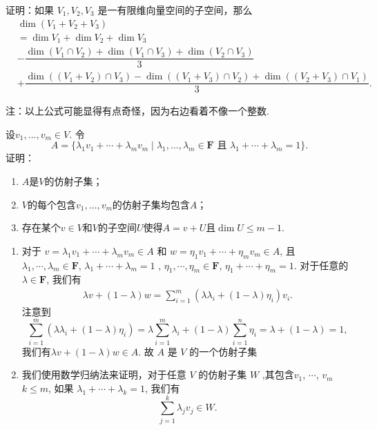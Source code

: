 \begin{exercise}
\begin{exgroup}
\begin{answer}
        \end{answer}

        \item 证明：如果 $V_1,V_2,V_3$ 是一有限维向量空间的子空间，那么
        \begin{align*}
            &\dim(V_1+V_2+V_3) \\
            &= \dim V_1+\dim V_2+\dim V_3 \\
            &-\dfrac{\dim(V_1\cap V_2)+\dim(V_1\cap V_3)+\dim(V_2\cap V_3)}{3} \\
            &+\dfrac{\dim((V_1 + V_2) \cap V_3) - \dim((V_1 + V_3) \cap V_2) + \dim((V_2 + V_3) \cap V_1)}{3}.
        \end{align*}

        注：以上公式可能显得有点奇怪，因为右边看着不像一个整数.
        \begin{answer}

        \end{answer}

        \item 设$v_1,\ldots,v_m\in V$. 令
        \[A=\{\lambda_1v_1+\cdots+\lambda_mv_m \mid \lambda_1,\ldots,\lambda_m\in\mathbf{F}\text{~且~}\lambda_1+\cdots+\lambda_m=1\}.\]
        证明：
        \begin{enumerate}
            \item $A$是$V$的仿射子集；

            \item $V$的每个包含$v_1,\ldots,v_m$的仿射子集均包含$A$；

            \item 存在某个$v\in V$和$V$的子空间$U$使得$A=v+U$且$\dim U\leqslant m-1$.
        \end{enumerate}
    \begin{answer}
        \begin{enumerate}
            \item 对于 $v=\lambda_1 v_1+\cdots+\lambda_m v_m\in A$ 和 $w=\eta_1 v_1+\cdots+\eta_m v_m\in A$, 且 $\lambda_1,\cdots,\lambda_m\in  \mathbf{F}$, $\lambda_1+\cdots+\lambda_m=1$ , $\eta_1,\cdots,\eta_m\in \mathbf{F}$, $\eta_1+\cdots+\eta_m=1$. 对于任意的$\lambda\in \mathbf{F}$, 我们有
            \begin{align*}
                \lambda v+(1-\lambda) w=\sum_{i=1}^m(\lambda\lambda_i+(1-\lambda)\eta_i)v_i.
            \end{align*}
            注意到
            \[ \sum_{i=1}^m(\lambda\lambda_i+(1-\lambda)\eta_i)=\lambda\sum_{i=1}^m\lambda_i+(1-\lambda)\sum_{i=1}^n\eta_i=\lambda+(1-\lambda)=1, \]
            我们有$\lambda v+(1-\lambda) w\in A$. 故 $A$ 是 $V$ 的一个仿射子集
        \item 我们使用数学归纳法来证明，对于任意 $V$ 的仿射子集 $W$ ,其包含$v_1$, $\cdots$, $v_m$$k\le m$,
            如果 $\lambda_1+\cdots+\lambda_k=1$,
            我们有 \[ \sum_{j=1}^k\lambda_jv_j\in W. \]


\end{enumerate}
\end{answer}
\end{exgroup}
\end{exercise}
